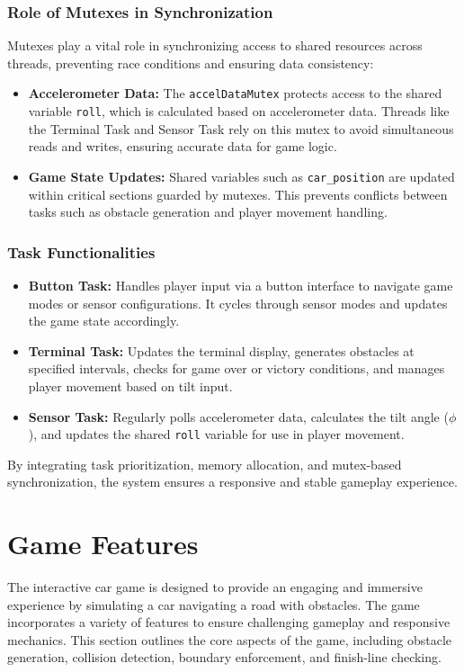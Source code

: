 \documentclass[conference]{IEEEtran}
\begin{document}
\subsubsection*{Role of Mutexes in Synchronization}  
Mutexes play a vital role in synchronizing access to shared resources across threads, preventing race conditions and ensuring data consistency:  
\begin{itemize}  
    \item \textbf{Accelerometer Data:}  
        The \texttt{accelDataMutex} protects access to the shared variable \texttt{roll}, which is calculated based on accelerometer data. Threads like the Terminal Task and Sensor Task rely on this mutex to avoid simultaneous reads and writes, ensuring accurate data for game logic.  

    \item \textbf{Game State Updates:}  
        Shared variables such as \texttt{car\_position} are updated within critical sections guarded by mutexes. This prevents conflicts between tasks such as obstacle generation and player movement handling.  
\end{itemize}  

\subsubsection*{Task Functionalities}  
\begin{itemize}  
    \item \textbf{Button Task:} Handles player input via a button interface to navigate game modes or sensor configurations. It cycles through sensor modes and updates the game state accordingly.  
    \item \textbf{Terminal Task:} Updates the terminal display, generates obstacles at specified intervals, checks for game over or victory conditions, and manages player movement based on tilt input.  
    \item \textbf{Sensor Task:} Regularly polls accelerometer data, calculates the tilt angle (\(\phi\)), and updates the shared \texttt{roll} variable for use in player movement.  
\end{itemize}  

By integrating task prioritization, memory allocation, and mutex-based synchronization, the system ensures a responsive and stable gameplay experience.  


\section{Game Features}
The interactive car game is designed to provide an engaging and immersive experience by simulating a car navigating a road with obstacles. The game incorporates a variety of features to ensure challenging gameplay and responsive mechanics. This section outlines the core aspects of the game, including obstacle generation, collision detection, boundary enforcement, and finish-line checking.
\end{document}
